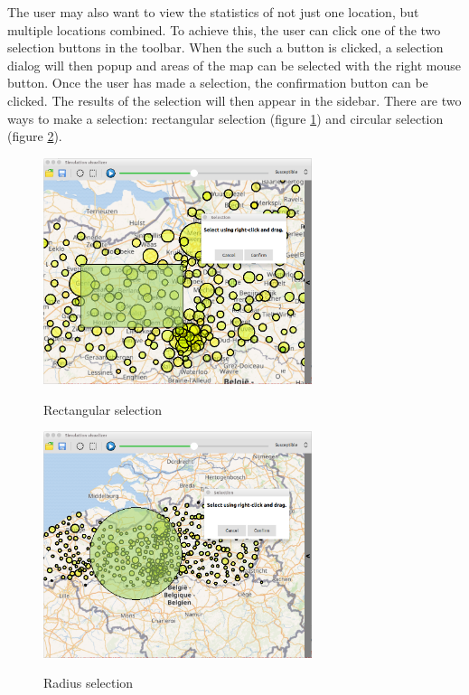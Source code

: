 The user may also want to view the statistics of not just one location, but multiple locations combined. To achieve this, the user can click one of the two selection buttons in the toolbar. When the such a button is clicked, a selection dialog will then popup and areas of the map can be selected with the right mouse button. Once the user has made a selection, the confirmation button can be clicked. The results of the selection will then appear in the sidebar. There are two ways to make a selection: rectangular selection (figure \ref{fig:screenshot_selectRect}) and circular selection (figure \ref{fig:screenshot_selectRad}).

\begin{figure}[H]
\centering
\includegraphics[width=0.7\textwidth,keepaspectratio]{images/select_rect.png}
\label{fig:screenshot_selectRect}
\caption{Rectangular selection}
\end{figure}

\begin{figure}[H]
\centering
\includegraphics[width=0.7\textwidth,keepaspectratio]{images/select_rad.png}
\label{fig:screenshot_selectRad}
\caption{Radius selection}
\end{figure}


